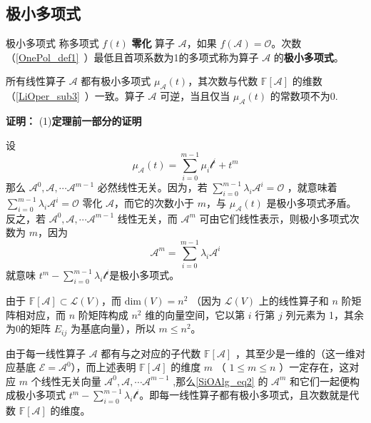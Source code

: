 \subsection{极小多项式}
\begin{definition}{极小多项式}
称多项式 $f(t)$ \textbf{零化} 算子 $\mathcal{A}$，如果 $f(\mathcal{A})=\mathcal O$。次数（\autoref{OnePol_def1}~）最低且首项系数为1的多项式称为算子 $\mathcal{A}$ 的\textbf{极小多项式}。
\end{definition}
\begin{theorem}{}
所有线性算子 $\mathcal{A}$ 都有极小多项式 $\mu_\mathcal{A}(t)$，其次数与代数 $\mathbb{F}[\mathcal{A}]$ 的维数（\autoref{LiOper_sub3}~）一致。算子 $\mathcal{A}$ 可逆，当且仅当 $\mu_\mathcal{A}(t)$ 的常数项不为0.
\end{theorem}
\textbf{证明：}
(1)\textbf{定理前一部分的证明}

设
\begin{equation}
\mu_\mathcal{A}(t)=\sum_{i=0}^{m-1}\mu_i\mathcal t^i+t^m
\end{equation}
那么 $\mathcal{A}^0,\mathcal{A},\cdots \mathcal{A}^{m-1}$ 必然线性无关。因为，若 $\sum\limits_{i=0}^{m-1}\lambda_i\mathcal{A}^i=\mathcal{O}$ ，就意味着 $\sum\limits_{i=0}^{m-1}\lambda_i\mathcal{A}^i=\mathcal{O}$ 零化 $\mathcal A$，而它的次数小于 $m$，与 $\mu_\mathcal{A}(t)$ 是极小多项式矛盾。反之，若 $\mathcal{A}^0,\mathcal{A},\cdots \mathcal{A}^{m-1}$ 线性无关，而 $\mathcal{A}^m$ 可由它们线性表示，则极小多项式次数为 $m$，因为
\begin{equation}\label{SiOAlg_eq2}
\mathcal A^m=\sum_{i=0}^{m-1}\lambda_i\mathcal A^i
\end{equation}
就意味 $t^m-\sum\limits_{i=0}^{m-1}\lambda_i\mathcal t^i$是极小多项式。

由于 $\mathbb{F}[\mathcal{A}]\subset\mathcal{L}(V)$，而 $\mathrm{dim}(V)=n^2$ （因为 $\mathcal{L}(V)$ 上的线性算子和 $n$ 阶矩阵相对应，而 $n$ 阶矩阵构成 $n^2$ 维的向量空间，它以第 $i$ 行第 $j$ 列元素为 1，其余为0的矩阵 $E_{ij}$ 为基底向量），所以 $m\leq n^2$。

由于每一线性算子 $\mathcal A$ 都有与之对应的子代数 $\mathbb{F}[\mathcal A]$ ，其至少是一维的（这一维对应基底 $\mathcal{E=A}^0$），而上述表明 $\mathbb{F}[\mathcal A]$ 的维度 $m$ （ $1\leq m\leq n$ ）一定存在，这对应 $m$ 个线性无关向量 $\mathcal{A}^0,\mathcal{A},\cdots \mathcal{A}^{m-1}$ ,那么\autoref{SiOAlg_eq2} 的 $\mathcal A^m$ 和它们一起便构成极小多项式 $t^m-\sum\limits_{i=0}^{m-1}\lambda_i\mathcal t^i$。即每一线性算子都有极小多项式，且次数就是代数 $\mathbb{F}[\mathcal{A}]$ 的维度。

